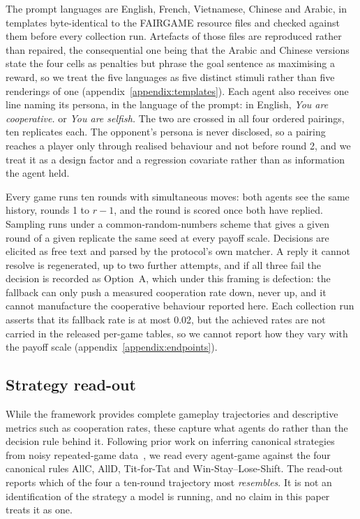 \documentclass[openacc]{rsproca_new}
\begin{document}
The prompt languages are English, French, Vietnamese, Chinese and Arabic, in
templates byte-identical to the FAIRGAME resource files and checked against
them before every collection run. Artefacts of those files are reproduced
rather than repaired, the consequential one being that the Arabic and Chinese
versions state the four cells as penalties but phrase the goal sentence as
maximising a reward, so we treat the five languages as five distinct stimuli
rather than five renderings of one (appendix~\ref{appendix:templates}). Each
agent also receives one line naming its persona, in the language of the prompt:
in English, \emph{You are cooperative.} or \emph{You are selfish.} The two are
crossed in all four ordered pairings, ten replicates each. The opponent's
persona is never disclosed, so a pairing reaches a player only through realised
behaviour and not before round 2, and we treat it as a design factor and a
regression covariate rather than as information the agent held.

Every game runs ten rounds with simultaneous moves: both agents see the same
history, rounds 1 to $r-1$, and the round is scored once both have replied.
Sampling runs under a common-random-numbers scheme that gives a given round of
a given replicate the same seed at every payoff scale. Decisions are elicited
as free text and parsed by the protocol's own matcher. A reply it cannot
resolve is regenerated, up to two further attempts, and if all three fail the
decision is recorded as Option~A, which under this framing is defection: the
fallback can only push a measured cooperation rate down, never up, and it
cannot manufacture the cooperative behaviour reported here. Each collection run
asserts that its fallback rate is at most 0.02, but the achieved rates are not
carried in the released per-game tables, so we cannot report how they vary with
the payoff scale (appendix~\ref{appendix:endpoints}).

\subsection{Strategy read-out}\label{sec:readout}

While the framework provides complete gameplay trajectories and descriptive
metrics such as cooperation rates, these capture what agents do rather than the
decision rule behind it. Following prior work on inferring canonical strategies
from noisy repeated-game data~\cite{han2011role,Han2012ALIFEjournal,diStefanoIntention2023},
we read every agent-game against the four canonical rules AllC, AllD,
Tit-for-Tat and Win-Stay--Lose-Shift. The read-out reports which of the four a
ten-round trajectory most \emph{resembles}. It is not an identification of the
strategy a model is running, and no claim in this paper treats it as one.
\end{document}
